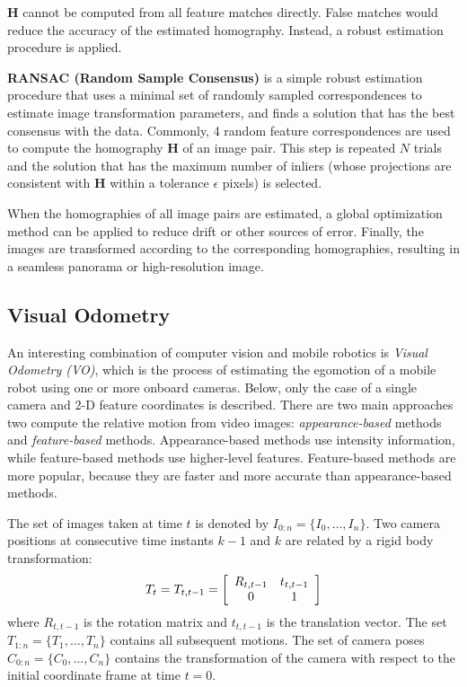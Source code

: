 $\boldsymbol{H}$ cannot be computed from all feature matches directly.
False matches would reduce the accuracy of the estimated homography.
Instead, a robust estimation procedure is applied.

\textbf{RANSAC (Random Sample Consensus)} \cite{fischler1981random} is a simple robust estimation procedure that uses a minimal set of randomly sampled correspondences to estimate image transformation parameters, and finds a solution that has the best consensus with the data.
Commonly, 4 random feature correspondences are used to compute the homography $\boldsymbol{H}$ of an image pair.
This step is repeated $N$ trials and the solution that has the maximum number of inliers (whose projections are consistent with $\boldsymbol{H}$ within a tolerance $\epsilon$ pixels) is selected.

When the homographies of all image pairs are estimated, a global optimization method can be applied to reduce drift or other sources of error.
Finally, the images are transformed according to the corresponding homographies, resulting in a seamless panorama or high-resolution image. 


\subsection{Visual Odometry}
\label{sec:background-visual-odometry}
An interesting combination of computer vision and mobile robotics is \textit{Visual Odometry (VO)}, which is the process of estimating the egomotion of a mobile robot using one or more onboard cameras.
Below, only the case of a single camera and 2-D feature coordinates is described.
There are two main approaches two compute the relative motion from video images: \textit{appearance-based} methods and \textit{feature-based} methods.
Appearance-based methods use intensity information, while feature-based methods use higher-level features.
Feature-based methods are more popular, because they are faster and more accurate than appearance-based methods.

The set of images taken at time $t$ is denoted by $I_{0:n} = \{I_0, \hdots, I_n\}$.
Two camera positions at consecutive time instants $k-1$ and $k$ are related by a rigid body transformation:
\begin{equation}
T_t = T_{t,t-1} = 
\left[ \begin{array}{c c}
R_{t,t-1} & t_{t,t-1} \\
0 & 1
\end{array} \right]
\end{equation}
where $R_{t,t-1}$ is the rotation matrix and $t_{t,t-1}$ is the translation vector.
The set $T_{1:n} = \{T_1, \hdots, T_n\}$ contains all subsequent motions.
The set of camera poses $C_{0:n} = \{C_0, \hdots, C_n\}$ contains the transformation of the camera with respect to the initial coordinate frame at time $t = 0$.

